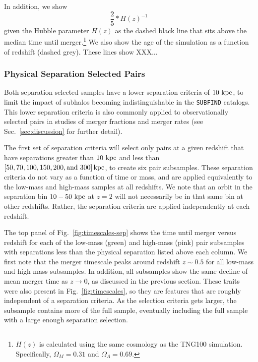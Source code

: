 \documentclass[twocolumn,linenumbers]{aastex631}
\begin{document}
    In addition, we show 
    \begin{equation}
    \frac{2}{5}*H(z)^{-1}
    \end{equation}
    given the Hubble parameter $H(z)$ as the dashed black line that sits above the median time until merger.\footnote{$H(z)$ is calculated using the same cosmology as the TNG100 simulation. Specifically, $\Omega_M=0.31$ and $\Omega_{\Lambda}=0.69$.}
    We also show the age of the simulation as a function of redshift (dashed grey). 
    These lines show XXX...


\subsubsection{Physical Separation Selected Pairs }
\label{sec:results-phys}
    Both separation selected samples have a lower separation criteria of $10\,\mathrm{\,kpc}$, to limit the impact of subhalos becoming indistinguishable in the \texttt{SUBFIND} catalogs.
    This lower separation criteria is also commonly applied to observationally selected pairs in studies of merger fractions and merger rates (see Sec.~\ref{sec:discussion} for further detail).
    
    The first set of separation criteria will select only pairs at a given redshift that have separations greater than $10\,\mathrm{\,kpc}$ and less than $[50, 70, 100, 150, 200, \mbox{and }300]\mathrm{\,kpc}$, to create six pair subsamples. 
    These separation criteria do not vary as a function of time or mass, and are applied equivalently to the low-mass and high-mass samples at all redshifts. 
    We note that an orbit in the separation bin $10-50\,\mathrm{\,kpc}$ at $z=2$ will not necessarily be in that same bin at other redshifts. 
    Rather, the separation criteria are applied independently at each redshift. 
    
    The top panel of Fig.~\ref{fig:timescales-sep} shows the time until merger versus redshift for each of the low-mass (green) and high-mass (pink) pair subsamples with separations less than the physical separation listed above each column.  
    We first note that the merger timescale peaks around redshift $z\sim0.5$ for all low-mass and high-mass subsamples. 
    In addition, all subsamples show the same decline of mean merger time as $z\to0$, as discussed in the previous section. 
    These traits were also present in Fig.~\ref{fig:timescales}, so they are features that are roughly independent of a separation criteria.
    As the selection criteria gets larger, the subsample contains more of the full sample, eventually including the full sample with a large enough separation selection.
    
\end{document}
